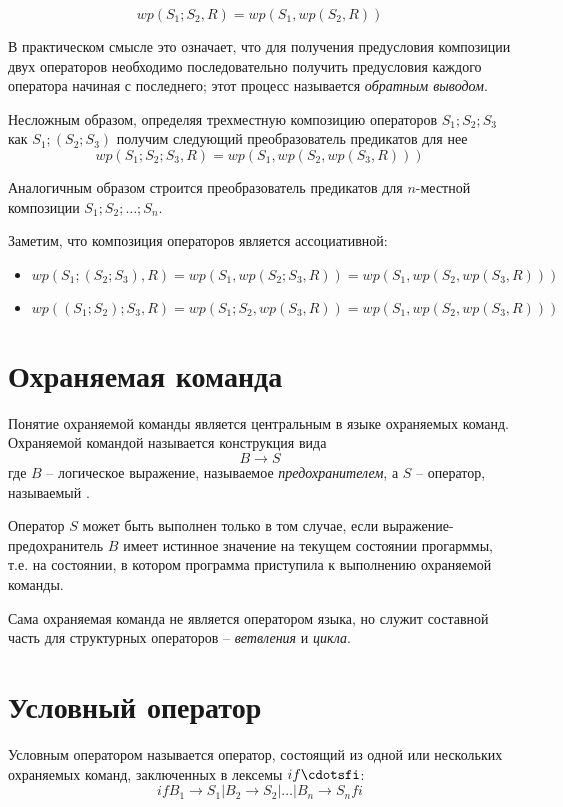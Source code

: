 \begin{equation}
	wp(S_1; S_2, R) = wp(S_1, wp(S_2, R))
\end{equation}

В практическом смысле это означает, что для получения предусловия композиции двух операторов необходимо
последовательно получить предусловия каждого оператора начиная с последнего; этот процесс называется \textit{обратным выводом}.

Несложным образом, определяя трехместную композицию операторов $S_1; S_2; S_3$ как $S_1; (S_2; S_3)$ получим
следующий преобразователь предикатов для нее
\begin{equation}
	wp(S_1; S_2; S_3, R) = wp(S_1, wp(S_2, wp(S_3, R)))
\end{equation}

Аналогичным образом строится преобразователь предикатов для $n$-местной композиции $S_1; S_2; \ldots; S_n$. 

Заметим, что композиция операторов является ассоциативной:
\begin{itemize}
	\item $wp(S_1; (S_2; S_3), R) = wp(S_1, wp(S_2; S_3, R)) = wp(S_1, wp(S_2, wp(S_3, R)))$
	\item $wp((S_1; S_2); S_3, R) = wp(S_1; S_2, wp(S_3, R)) = wp(S_1, wp(S_2, wp(S_3, R)))$
\end{itemize}
\section{Охраняемая команда}

Понятие охраняемой команды является центральным в языке охраняемых команд. 
Охраняемой командой называется конструкция вида
\begin{equation}
	B \rightarrow S
\end{equation}
где $B$ -- логическое выражение, называемое \textit{предохранителем}, а $S$ -- оператор, называемый .

Оператор $S$ может быть выполнен только в том случае, если выражение-предохранитель $B$ имеет истинное значение
на текущем состоянии прогарммы, т.е. на состоянии, в котором программа приступила к выполнению охраняемой команды.

Сама охраняемая команда не является оператором языка, но служит составной часть для структурных операторов
-- \textit{ветвления} и \textit{цикла}.

\section{Условный оператор}
Условным оператором называется оператор, состоящий из одной или нескольких охраняемых команд, 
заключенных в лексемы $if\cdotsfi$:
\begin{equation}
	if B_1 \rightarrow S_1 | B_2 \rightarrow S_2 | \ldots | B_n \rightarrow S_n fi
\end{equation}

